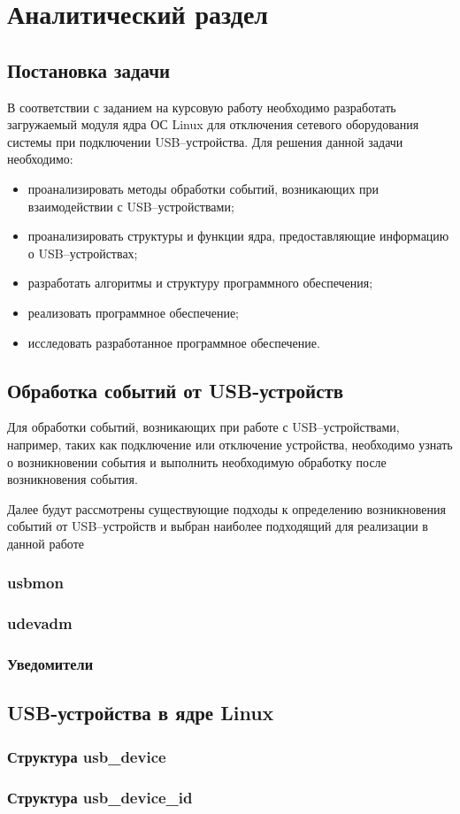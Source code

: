 \chapter{Аналитический раздел}

\section{Постановка задачи}

В соответствии с заданием на курсовую работу необходимо разработать загружаемый модуля ядра ОС Linux для отключения сетевого оборудования системы при подключении USB–устройства. Для решения данной задачи необходимо:

\begin{itemize}
	\item проанализировать методы обработки событий, возникающих при взаимодействии с USB–устройствами;
	\item проанализировать структуры и функции ядра, предоставляющие информацию о USB–устройствах;
	\item разработать алгоритмы и структуру программного обеспечения;
	\item реализовать программное обеспечение;
	\item исследовать разработанное программное обеспечение.
\end{itemize}

\section{Обработка событий от USB-устройств}

Для обработки событий, возникающих при работе с USB–устройствами, например, таких как подключение или отключение устройства, необходимо узнать о возникновении события и выполнить необходимую обработку после возникновения события.

Далее будут рассмотрены существующие подходы к определению возникновения событий от USB–устройств и выбран наиболее подходящий для реализации в данной работе

\subsection{usbmon}

\subsection{udevadm}

\subsection{Уведомители}

\section{USB-устройства в ядре Linux}

\subsection{Структура usb\_device}

\subsection{Структура usb\_device\_id}